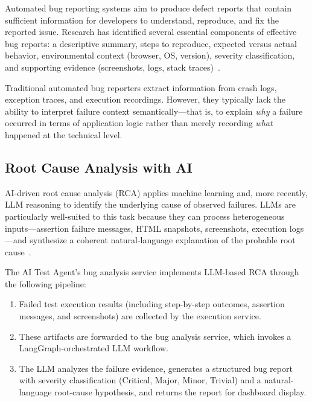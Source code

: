 Automated bug reporting systems aim to produce defect reports that
contain sufficient information for developers to understand, reproduce,
and fix the reported issue. Research has identified several essential
components of effective bug reports: a descriptive summary, steps to
reproduce, expected versus actual behavior, environmental context
(browser, OS, version), severity classification, and supporting
evidence (screenshots, logs, stack traces)~\cite{aniche2022testing}.

Traditional automated bug reporters extract information from crash
logs, exception traces, and execution recordings. However, they
typically lack the ability to interpret failure context semantically---that
is, to explain \emph{why} a failure occurred in terms of application
logic rather than merely recording \emph{what} happened at the
technical level.

\subsection{Root Cause Analysis with AI}
\label{subsec:root_cause_ai}

AI-driven root cause analysis (RCA) applies machine learning and,
more recently, LLM reasoning to identify the underlying cause of
observed failures. LLMs are particularly well-suited to this task
because they can process heterogeneous inputs---assertion failure
messages, HTML snapshots, screenshots, execution logs---and synthesize
a coherent natural-language explanation of the probable root
cause~\cite{openai2023gpt4}.

The AI Test Agent's bug analysis service implements LLM-based RCA
through the following pipeline:

\begin{enumerate}[nosep]
  \item Failed test execution results (including step-by-step outcomes,
        assertion messages, and screenshots) are collected by the
        execution service.
  \item These artifacts are forwarded to the bug analysis service, which
        invokes a LangGraph-orchestrated LLM workflow.
  \item The LLM analyzes the failure evidence, generates a structured
        bug report with severity classification (Critical, Major, Minor,
        Trivial) and a natural-language root-cause hypothesis, and
        returns the report for dashboard display.
\end{enumerate}

